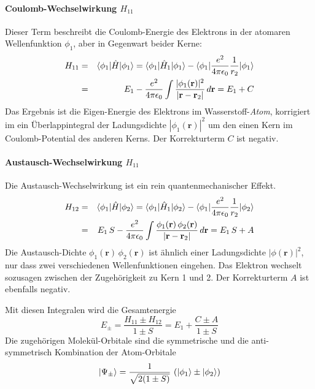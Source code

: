 \paragraph{Coulomb-Wechselwirkung $H_{11}$}  Dieser Term beschreibt die Coulomb-Energie des Elektrons in der atomaren Wellenfunktion $\phi_1$, aber in Gegenwart beider Kerne:
\begin{eqnarray}
H_{11} &= &  \braket{\phi_1 | \hat{H} | \phi_1} = \braket{\phi_1 | \hat{H}_1 | \phi_1}  - \braket{\phi_1 |  \frac{e^2}{4 \pi \epsilon_0} \frac{1}{r_{2}} | \phi_1}  \\
 & = & E_1 - \frac{e^2}{4 \pi \epsilon_0} \int \frac{|\phi_1(\mathbf{r})|^2 }{|\mathbf{r} - \mathbf{r}_2  |} \, d\mathbf{r} = E_1 + C
\end{eqnarray}
Das Ergebnis ist die Eigen-Energie des Elektrons im Wasserstoff-\emph{Atom}, korrigiert im ein Überlappintegral der Ladungsdichte ${|\phi_1(\mathbf{r})|^2 }$ um den einen Kern im Coulomb-Potential des anderen Kerns. Der Korrekturterm $C$ ist negativ.

\paragraph{Austausch-Wechselwirkung $H_{11}$} Die Austausch-Wechselwirkung ist ein rein quantenmechanischer Effekt.
\begin{eqnarray}
H_{12} &= &  \braket{\phi_1 | \hat{H} | \phi_2} = \braket{\phi_1 | \hat{H}_1 | \phi_2}  - \braket{\phi_1 |  \frac{e^2}{4 \pi \epsilon_0} \frac{1}{r_{2}} | \phi_2}  \\
 & = & E_1 \, S - \frac{e^2}{4 \pi \epsilon_0} \int \frac{ \phi_1(\mathbf{r}) \, \phi_2(\mathbf{r})  }{|\mathbf{r} - \mathbf{r}_2  |} \, d\mathbf{r} = E_1 \, S + A
\end{eqnarray}
Die Austausch-Dichte $\phi_1(\mathbf{r}) \, \phi_2(\mathbf{r})$ ist ähnlich einer Ladungsdichte $|\phi(\mathbf{r})|^2$, nur dass zwei verschiedenen Wellenfunktionen eingehen. Das Elektron wechselt sozusagen zwischen der Zugehörigkeit zu Kern 1 und 2. Der Korrekturterm $A$ ist ebenfalls negativ.

Mit diesen Integralen wird die Gesamtenergie
\begin{equation}
E_\pm = \frac{H_{11} \pm H_{12}}{1 \pm S} = E_1 + \frac{C \pm A}{1 \pm S}
\end{equation}
Die zugehörigen Molekül-Orbitale sind die symmetrische und die anti-symmetrisch Kombination der Atom-Orbitale
\begin{equation}
\ket{\Psi_\pm }= \frac{1}{\sqrt{2 (1 \pm  S)}} \, \left( \ket{\phi_1} \pm \ket{\phi_2} \right)
\end{equation}

